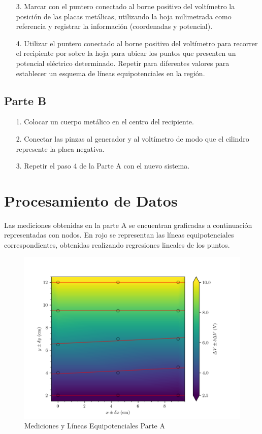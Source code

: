 \documentclass{article}
\begin{document}
\begin{itemize}
  \item [3.] Marcar con el puntero conectado al borne positivo del voltímetro la posición de las placas metálicas, utilizando la hoja milimetrada como referencia y registrar la información (coordenadas y potencial).
  \item [4.] Utilizar el puntero conectado al borne positivo del voltímetro para recorrer el recipiente por sobre la hoja para ubicar los puntos que presenten un potencial eléctrico determinado. Repetir para diferentes valores para establecer un esquema de líneas equipotenciales en la región.
\end{itemize}

\subsection{Parte B}
\begin{itemize}
  \item [1.] Colocar un cuerpo metálico en el centro del recipiente.  
  \item [2.] Conectar las pinzas al generador y al voltímetro de modo que el cilindro represente la placa negativa.
  \item [3.] Repetir el paso 4 de la Parte A con el nuevo sistema.
\end{itemize}

\section{Procesamiento de Datos}

Las mediciones obtenidas en la parte A se encuentran graficadas a continuación representadas con nodos. En rojo se representan las líneas equipotenciales correspondientes, obtenidas realizando regresiones lineales de los puntos. 

\begin{figure}[H]
  \hspace{-0.1cm}\includegraphics[scale=0.2]{plot1.png}
  \caption{Mediciones y Líneas Equipotenciales Parte A}
\label{fig:leqA}
\end{figure}
\end{document}
